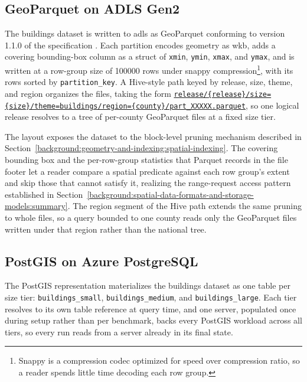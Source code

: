 \subsection{GeoParquet on ADLS Gen2}
\label{system-architecture-and-implementation:data-layer:geoparquet-on-adls-gen2}

The buildings dataset is written to \acrshort{adls} as GeoParquet conforming to version 1.1.0 of the specification \parencite{ogc2024_geoparquet_specification_v110}. Each partition encodes geometry as \acrshort{wkb}, adds a covering bounding-box column as a struct of \texttt{xmin}, \texttt{ymin}, \texttt{xmax}, and \texttt{ymax}, and is written at a row-group size of \num{100000} rows under snappy compression\footnote{Snappy is a compression codec optimized for speed over compression ratio, so a reader spends little time decoding each row group.}, with its rows sorted by \texttt{partition\_key}. A Hive-style path keyed by release, size, theme, and region organizes the files, taking the form \texttt{\url{release/{release}/size={size}/theme=buildings/region={county}/part\_XXXXX.parquet}}, so one logical release resolves to a tree of per-county GeoParquet files at a fixed size tier.

The layout exposes the dataset to the block-level pruning mechanism described in Section~\ref{background:geometry-and-indexing:spatial-indexing}. The covering bounding box and the per-row-group statistics that Parquet records in the file footer let a reader compare a spatial predicate against each row group's extent and skip those that cannot satisfy it, realizing the range-request access pattern established in Section~\ref{background:spatial-data-formats-and-storage-models:summary}. The region segment of the Hive path extends the same pruning to whole files, so a query bounded to one county reads only the GeoParquet files written under that region rather than the national tree.

\subsection{PostGIS on Azure PostgreSQL}
\label{system-architecture-and-implementation:data-layer:postgis-on-azure-postgresql}

The PostGIS representation materializes the buildings dataset as one table per size tier: \texttt{buildings\_small}, \texttt{buildings\_medium}, and \texttt{buildings\_large}. Each tier resolves to its own table reference at query time, and one server, populated once during setup rather than per benchmark, backs every PostGIS workload across all tiers, so every run reads from a server already in its final state.

